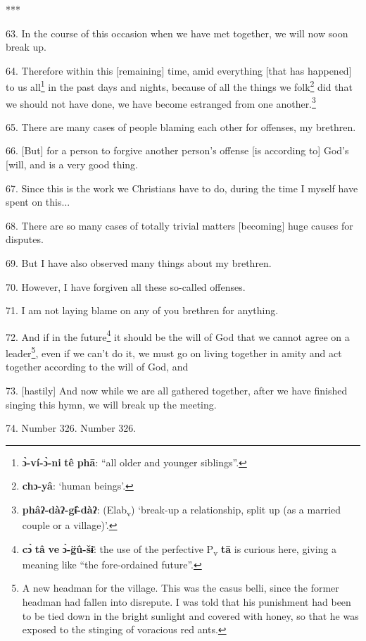 ***

63. In the course of this occasion when we have met together, we will now soon
break up.

64. Therefore within this [remaining] time, amid everything [that has happened]
to us all\footnote{\textbf{ɔ̀-ví-ɔ̀-ni} \textbf{tê} \textbf{phā}: ``all older and younger siblings''.} in the past days and nights, because of all the things we folk\footnote{\textbf{chɔ-yâ}: `human beings'.}
did that we should not have done, we have become estranged from one another.\footnote{\textbf{phâʔ-dàʔ-gɨ̂-dàʔ}: (Elab\textsubscript{v}) `break-up a relationship, split up (as a married couple or a village)'.}

65. There are many cases of people blaming each other for offenses, my brethren.

66. [But] for a person to forgive another person's offense [is according to] God's
[will, and is a very good thing.

67. Since this is the work we Christians have to do, during the time I myself have
spent on this...

68. There are so many cases of totally trivial matters [becoming] huge causes for
disputes.

69. But I have also observed many things about my brethren.

70. However, I have forgiven all these so-called offenses.

71. I am not laying blame on any of you brethren for anything.

72. And if in the future\footnote{\textbf{cɔ̀} \textbf{tâ} \textbf{ve} \textbf{ɔ̀-g̈û-šɨ̄}: the use of the perfective P\textsubscript{v} \textbf{tā} is curious here, giving a meaning like ``the fore-ordained future''.} it should be the will of God that we cannot agree on
a leader\footnote{A new headman for the village. This was the casus belli, since the former headman had fallen into disrepute. I was told that his punishment had been to be tied down in the bright sunlight and covered with honey, so that he was exposed to the stinging of voracious red ants.}, even if we can't do it, we must go on living together in amity and
act together according to the will of God, and 

73. [hastily] And now while we are all gathered together, after we have finished
singing this hymn, we will break up the meeting.

74. Number 326. Number 326.

